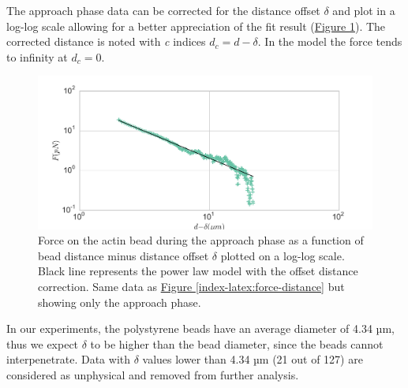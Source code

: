 \documentclass[A4paperpaper,11pt,english]{sphinxmanual}
\begin{document}
The approach phase data can be corrected for the distance offset \(\delta\)
and plot in a log-log scale allowing for a better appreciation of the fit
result (\hyperref[index-latex:force-distance-log-log]{Figure  \ref*{index-latex:force-distance-log-log}}). The corrected distance is noted with  \emph{c} indices \(d_c = d-
\delta\). In the model the force tends to infinity at \(d_c = 0\).
\begin{figure}[htbp]
\centering
\capstart

\includegraphics[width=0.800\linewidth]{force-distance-fit-loglog.pdf}
\caption{Force on the actin bead  during the approach phase as a function of bead distance
minus distance offset \(\delta\) plotted on a log-log scale. Black line
represents the power law model with the offset distance correction. Same
data as \hyperref[index-latex:force-distance]{Figure  \ref*{index-latex:force-distance}} but showing only the approach phase.}\label{index-latex:force-distance-log-log}\end{figure}

In our experiments, the polystyrene beads have an average diameter of 4.34 µm,
thus we expect \(\delta\) to be higher than the bead diameter, since the beads cannot interpenetrate.  Data with
\(\delta\) values lower than 4.34 µm (21 out of 127) are considered as
unphysical and removed from further analysis.
\end{document}
